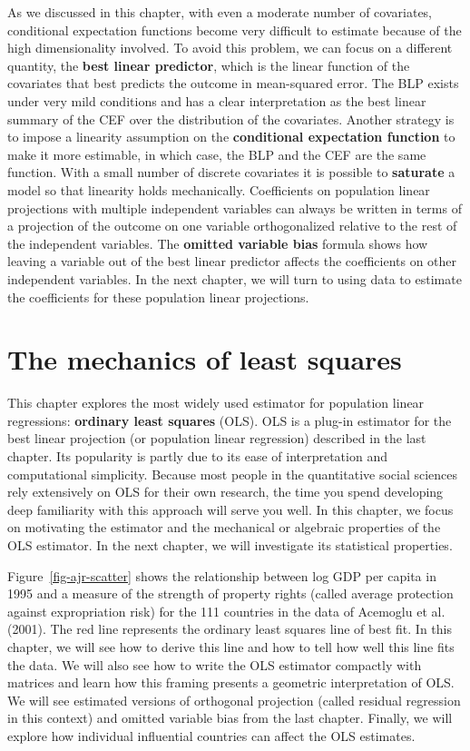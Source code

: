\documentclass[
  13pt,
  letterpaper,
  DIV=11,
  numbers=noendperiod]{scrreprt}
\theoremstyle{plain}
\theoremstyle{plain}
\theoremstyle{definition}
\theoremstyle{definition}
\theoremstyle{remark}
\begin{document}
As we discussed in this chapter, with even a moderate number of
covariates, conditional expectation functions become very difficult to
estimate because of the high dimensionality involved. To avoid this
problem, we can focus on a different quantity, the \textbf{best linear
predictor}, which is the linear function of the covariates that best
predicts the outcome in mean-squared error. The BLP exists under very
mild conditions and has a clear interpretation as the best linear
summary of the CEF over the distribution of the covariates. Another
strategy is to impose a linearity assumption on the \textbf{conditional
expectation function} to make it more estimable, in which case, the BLP
and the CEF are the same function. With a small number of discrete
covariates it is possible to \textbf{saturate} a model so that linearity
holds mechanically. Coefficients on population linear projections with
multiple independent variables can always be written in terms of a
projection of the outcome on one variable orthogonalized relative to the
rest of the independent variables. The \textbf{omitted variable bias}
formula shows how leaving a variable out of the best linear predictor
affects the coefficients on other independent variables. In the next
chapter, we will turn to using data to estimate the coefficients for
these population linear projections.

\chapter{The mechanics of least squares}\label{sec-ols-mechanics}

This chapter explores the most widely used estimator for population
linear regressions: \textbf{ordinary least squares} (OLS). OLS is a
plug-in estimator for the best linear projection (or population linear
regression) described in the last chapter. Its popularity is partly due
to its ease of interpretation and computational simplicity. Because most
people in the quantitative social sciences rely extensively on OLS for
their own research, the time you spend developing deep familiarity with
this approach will serve you well. In this chapter, we focus on
motivating the estimator and the mechanical or algebraic properties of
the OLS estimator. In the next chapter, we will investigate its
statistical properties.

Figure~\ref{fig-ajr-scatter} shows the relationship between log GDP per
capita in 1995 and a measure of the strength of property rights (called
average protection against expropriation risk) for the 111 countries in
the data of Acemoglu et al. (2001). The red line represents the ordinary
least squares line of best fit. In this chapter, we will see how to
derive this line and how to tell how well this line fits the data. We
will also see how to write the OLS estimator compactly with matrices and
learn how this framing presents a geometric interpretation of OLS. We
will see estimated versions of orthogonal projection (called residual
regression in this context) and omitted variable bias from the last
chapter. Finally, we will explore how individual influential countries
can affect the OLS estimates.
\end{document}
